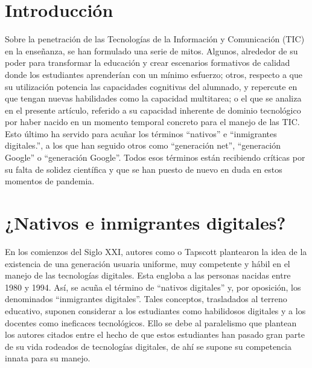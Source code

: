 \documentclass[spanish]{textolivre}
\begin{document}
\begin{polyabstract}
\begin{english}
\begin{abstract}
\end{abstract}
\end{english}
\end{polyabstract}

\section{Introducción}
Sobre la penetración de las Tecnologías de la Información y Comunicación (TIC) en la enseñanza, se han formulado una serie de mitos. Algunos, alrededor de su poder para transformar la educación y crear escenarios formativos de calidad donde los estudiantes aprenderían con un mínimo esfuerzo; otros, respecto a que su utilización potencia las capacidades cognitivas del alumnado, y repercute en que tengan nuevas habilidades como la capacidad multitarea; o el que se analiza en el presente artículo, referido a su capacidad inherente de dominio tecnológico por haber nacido en un momento temporal concreto para el manejo de las TIC. Esto último ha servido para acuñar los términos “nativos” e “inmigrantes digitales.”, a los que han seguido otros como “generación net”, “generación Google” o “generación Google”. Todos esos términos están recibiendo críticas por su falta de solidez científica y que se han puesto de nuevo en duda en estos momentos de pandemia.

\section{¿Nativos e inmigrantes digitales?}
En los comienzos del Siglo XXI, autores como \textcite{prensky_ensenar_2011} o \textcite{tapscott_grown_2009} Tapscott plantearon la idea de la existencia de una generación usuaria uniforme, muy competente y hábil en el manejo de las tecnologías digitales. Esta engloba a las personas nacidas entre 1980 y 1994. Así, se acuña el término de “nativos digitales” y, por oposición, los denominados “inmigrantes digitales”. Tales conceptos, trasladados al terreno educativo, suponen considerar a los estudiantes como habilidosos digitales y a los docentes como ineficaces tecnológicos. Ello se debe al paralelismo que plantean los autores citados entre el hecho de que estos estudiantes han pasado gran parte de su vida rodeados de tecnologías digitales, de ahí se supone su competencia innata para su manejo. 
\end{document}
